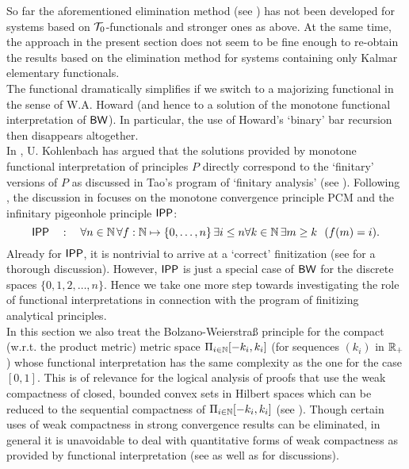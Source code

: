 So far the aforementioned elimination method (see \cite{Kohlenbach98,Kohlenbach00}) has not been 
developed for systems based on $\mathcal{T}_0$-functionals and stronger ones as above. 
At the same time, the approach in the present 
section does not seem to be fine enough 
to re-obtain the results based on the elimination method for
systems containing only Kalmar elementary 
functionals. 
\\[1mm] 
The functional dramatically simplifies if we switch to a majorizing functional 
in the sense of W.A. Howard (and hence to a solution of the monotone 
functional interpretation of $\textsf{\upshape BW}$). In particular, the use of 
Howard's `binary' bar recursion then disappears altogether. 
\\[1mm] In \cite{Kohlenbach08}, U. Kohlenbach has argued 
that the solutions provided by monotone functional interpretation 
of principles $P$ directly 
correspond to the `finitary' versions of $P$ as discussed in Tao's 
program of `finitary analysis' (see \cite{Tao07}). Following \cite{Tao07},  
the discussion in \cite{Kohlenbach08} focuses on the monotone 
convergence principle PCM and the infinitary pigeonhole principle $\textsf{\upshape IPP}$:
\[ \textsf{\upshape IPP}\quad:\quad\forall n\in\mathbb{N} \,\forall f:\mathbb{N}\mapsto\{0, \ldots, n\}
\,\exists i\leq n \forall k\in\mathbb{N}\,\exists m\geq k\ \ (f(m)=i). \] 
Already for $\textsf{\upshape IPP}$, it is nontrivial to arrive at a `correct' 
finitization (see \cite{GasparKohlenbach} for a thorough discussion). 
However, $\textsf{\upshape IPP}$ is just a special case of $\textsf{\upshape BW}$ for the discrete 
spaces $\{ 0,1,2,\ldots,n\}.$ Hence we take one more step towards  
investigating the role of functional interpretations in connection with 
the program of finitizing analytical principles. 
\\[1mm] In this section we also treat the Bolzano-Weierstra\ss{} principle for 
the compact (w.r.t. the product metric) metric space $\Pi_{i\in\mathbb{N}} 
[-k_i,k_i]$ (for sequences $(k_i)$ in $\mathbb{R}_+$) whose functional 
interpretation has the same complexity as the one for the case $[0,1].$ 
This is of relevance for the logical analysis of proofs that use the weak 
compactness of closed, bounded convex sets in Hilbert spaces which can 
be reduced to the sequential compactness of $\Pi_{i\in\mathbb{N}} 
[-k_i,k_i]$ (see \cite{KohlenbachMints,Kohlenbach(Baillon)}). 
Though certain uses of weak compactness in strong convergence results 
can be eliminated, in general it is unavoidable 
to deal with quantitative forms of weak compactness as provided 
by functional interpretation (see \cite{Kohlenbach2011} as well as 
\cite{Kohlenbach(Baillon)} for discussions).  
